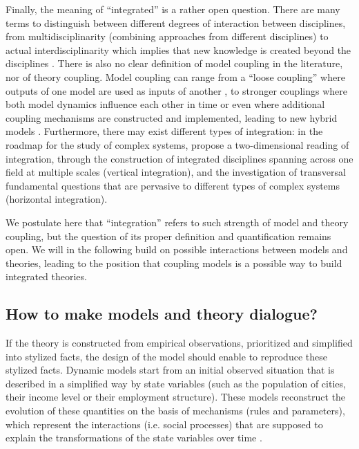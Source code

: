 \documentclass[10pt]{article}
\begin{document}
Finally, the meaning of ``integrated'' is a rather open question. There are many terms to distinguish between different degrees of interaction between disciplines, from multidisciplinarity (combining approaches from different disciplines) to actual interdisciplinarity which implies that new knowledge is created beyond the disciplines \citep{huutoniemi2010analyzing}. There is also no clear definition of model coupling in the literature, nor of theory coupling. Model coupling can range from a ``loose coupling'' where outputs of one model are used as inputs of another \citep{clarke1998loose}, to stronger couplings where both model dynamics influence each other in time or even where additional coupling mechanisms are constructed and implemented, leading to new hybrid models \citep{mustafa2017coupling}. Furthermore, there may exist different types of integration: in the roadmap for the study of complex systems, \citep{chavalarias2009french} propose a two-dimensional reading of integration, through the construction of integrated disciplines spanning across one field at multiple scales (vertical integration), and the investigation of transversal fundamental questions that are pervasive to different types of complex systems (horizontal integration).

We postulate here that ``integration'' refers to such strength of model and theory coupling, but the question of its proper definition and quantification remains open. We will in the following build on possible interactions between models and theories, leading to the position that coupling models is a possible way to build integrated theories.

\subsection{How to make models and theory dialogue?}

If the theory is constructed from empirical observations, prioritized and simplified into stylized facts, the design of the model should enable to reproduce these stylized facts. Dynamic models start from an initial observed situation that is described in a simplified way by state variables (such as the population of cities, their income level or their employment structure). These models reconstruct the evolution of these quantities on the basis of mechanisms (rules and parameters), which represent the interactions (i.e. social processes) that are supposed to explain the transformations of the state variables over time \citep{pumain2013theoretical}.
\end{document}
